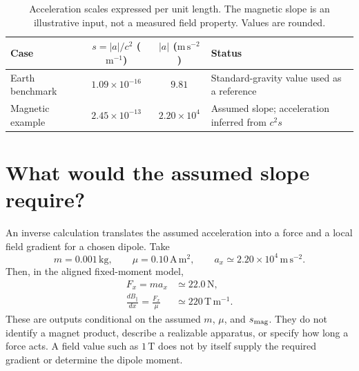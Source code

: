 \documentclass[12pt]{article}
\begin{document}
\begin{table}[ht]
  \centering
  \small
  \begin{tabular}{@{}lccp{6.2cm}@{}}
    \toprule
    Case & $s=|a|/c^2$ ($\mathrm{m^{-1}}$) & $|a|$ ($\mathrm{m\,s^{-2}}$) & Status \\
    \midrule
    Earth benchmark & $1.09\times10^{-16}$ & $9.81$ & Standard-gravity value used as a reference \\
    Magnetic example & $2.45\times10^{-13}$ & $2.20\times10^4$ & Assumed slope; acceleration inferred from $c^2s$ \\
    \bottomrule
  \end{tabular}
  \caption{Acceleration scales expressed per unit length. The magnetic slope is an illustrative input, not a measured field property. Values are rounded.}
  \label{tab:slope-comparison}
\end{table}

\section{What would the assumed slope require?}
\label{sec:inverse-example}

An inverse calculation translates the assumed acceleration into a force and a local field gradient for a chosen dipole. Take
\begin{equation}
  m=0.001\,\mathrm{kg},
  \qquad
  \mu=0.10\,\mathrm{A\,m^2},
  \qquad
  a_x\simeq2.20\times10^4\,\mathrm{m\,s^{-2}}.
  \label{eq:assumed-dipole-values}
\end{equation}
Then, in the aligned fixed-moment model,
\begin{align}
  F_x=ma_x&\simeq22.0\,\mathrm N,\\
  \frac{dB_{\parallel}}{dx}
  =\frac{F_x}{\mu}&\simeq220\,\mathrm{T\,m^{-1}}.
  \label{eq:inverse-gradient}
\end{align}
These are outputs conditional on the assumed $m$, $\mu$, and $s_{\rm mag}$. They do not identify a magnet product, describe a realizable apparatus, or specify how long a force acts. A field value such as $1\,\mathrm T$ does not by itself supply the required gradient or determine the dipole moment.
\end{document}
